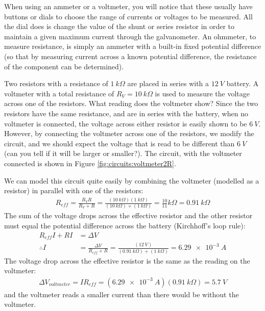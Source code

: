 When using an ammeter or a voltmeter, you will notice that these usually have buttons or dials to choose the range of currents or voltages to be measured. All the dial does is change the value of the shunt or series resistor in order to maintain a given maximum current through the galvanometer. An ohmmeter, to measure resistance, is simply an ammeter with a built-in fixed potential difference (so that by measuring current across a known potential difference, the resistance of the component can be determined). 
\begin{example}{Two resistors with a resistance of $\SI{1}{k\Omega}$ are placed in series with a $\SI{12}{V}$ battery. A voltmeter with a total resistance of $R_V=\SI{10}{k\Omega}$ is used to measure the voltage across one of the resistors. What reading does the voltmeter show?}
Since the two resistors have the same resistance, and are in series with the battery, when no voltmeter is connected, the voltage across either resistor is easily shown to be $\SI{6}{V}$. However, by connecting the voltmeter across one of the resistors, we modify the circuit, and we should expect the voltage that is read to be different than $\SI{6}{V}$ (can you tell if it will be larger or smaller?). The circuit, with the voltmeter connected is shown in Figure \ref{fig:circuits:voltmeter2R}.


We can model this circuit quite easily by combining the voltmeter (modelled as a resistor) in parallel with one of the resistors:
\begin{align*}
R_{eff}=\frac{R_VR}{R_V+R}=\frac{(\SI{10}{k\Omega})(\SI{1}{k\Omega})}{(\SI{10}{k\Omega})+(\SI{1}{k\Omega})}=\frac{10}{11}\si{k\Omega}=\SI{0.91}{k\Omega}
\end{align*}
The sum of the voltage drops across the effective resistor and the other resistor must equal the potential difference across the battery (Kirchhoff's loop rule):
\begin{align*}
R_{eff}I+RI&=\Delta V\\
\therefore I &= \frac{\Delta V}{R_{eff}+R}=\frac{(\SI{12}{V})}{(\SI{0.91}{k\Omega})+(\SI{1}{k\Omega})}=\SI{6.29e-3}{A}
\end{align*}
The voltage drop across the effective resistor is the same as the reading on the voltmeter:
\begin{align*}
\Delta V_{voltmeter}=IR_{eff}=(\SI{6.29e-3}{A})(\SI{0.91}{k\Omega})=\SI{5.7}{V}
\end{align*}
and the voltmeter reads a smaller current than there would be without the voltmeter.


\end{example}
